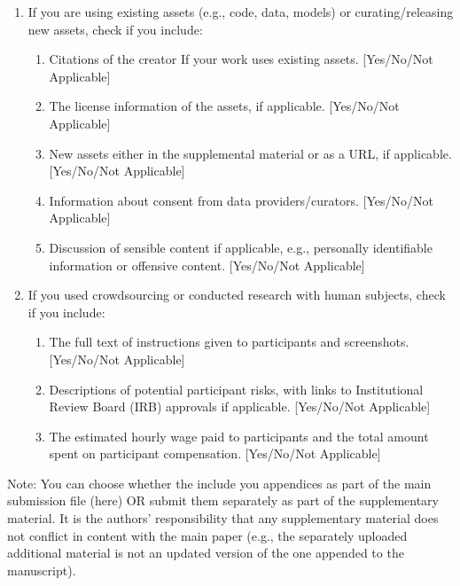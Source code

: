 \begin{enumerate}
  \item If you are using existing assets (e.g., code, data, models) or curating/releasing new assets, check if you include:
  \begin{enumerate}
    \item Citations of the creator If your work uses existing assets. [Yes/No/Not Applicable]
    \item The license information of the assets, if applicable. [Yes/No/Not Applicable]
    \item New assets either in the supplemental material or as a URL, if applicable. [Yes/No/Not Applicable]
    \item Information about consent from data providers/curators. [Yes/No/Not Applicable]
    \item Discussion of sensible content if applicable, e.g., personally identifiable information or offensive content. [Yes/No/Not Applicable]
  \end{enumerate}

  \item If you used crowdsourcing or conducted research with human subjects, check if you include:
  \begin{enumerate}
    \item The full text of instructions given to participants and screenshots. [Yes/No/Not Applicable]
    \item Descriptions of potential participant risks, with links to Institutional Review Board (IRB) approvals if applicable. [Yes/No/Not Applicable]
    \item The estimated hourly wage paid to participants and the total amount spent on participant compensation. [Yes/No/Not Applicable]
  \end{enumerate}

\end{enumerate}



\clearpage
\appendix
\thispagestyle{empty}

\onecolumn
{}

Note: You can choose whether the include you appendices as part of the main submission file (here) OR submit them separately as part of the supplementary material. It is the authors' responsibility that any supplementary material does not conflict in content with the main paper (e.g., the separately uploaded additional material is not an updated version of the one appended to the manuscript).

